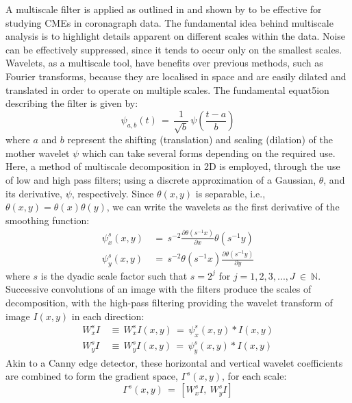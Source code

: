 \documentclass[preprint2]{aastex}
\begin{document}
A multiscale filter is applied as outlined in \citet{2008SoPh..248..457Y} and shown by \citet{2009A&A...495..325B, 2010NatCo...1E..74B, 2010byrnethesis, 2011AdSpR..47.2118G, 2011igi-global} to be effective for studying CMEs in coronagraph data. The fundamental idea behind multiscale analysis is to highlight details apparent on different scales within the data. Noise can be effectively suppressed, since it tends to occur only on the smallest scales. Wavelets, as a multiscale tool, have benefits over previous methods, such as Fourier transforms, because they are localised in space and are easily dilated and translated in order to operate on multiple scales. The fundamental equat5ion describing the filter is given by:
\begin{equation}
\psi_{a,b}(t)\,=\, \frac{1}{\sqrt{b}} \, \psi (\frac{t-a}{b})
\end{equation}
where $a$ and $b$ represent the shifting (translation) and scaling (dilation) of the mother wavelet $\psi$ which can take several forms depending on the required use. Here, a method of multiscale decomposition in 2D is employed, through the use of low and high pass filters; using a discrete approximation of a Gaussian, $\theta$, and its derivative, $\psi$, respectively. Since $\theta(x,y)$ is separable, i.e., $\theta(x,y)=\theta(x)\theta(y)$, we can write the wavelets as the first derivative of the smoothing function:
\begin{eqnarray}
\psi_{x}^{s}(x,y)\,&=\, s^{-2} \frac{\partial \theta(s^{-1}x)}{\partial x}\theta(s^{-1}y) \\
\psi_{y}^{s}(x,y)\,&=\, s^{-2} \theta(s^{-1}x)\frac{\partial \theta(s^{-1}y)}{\partial y}
\end{eqnarray}
where $s$ is the dyadic scale factor such that $s=2^j$ for $j=1,2,3,...,J~\in~\mathbb{N}$. Successive convolutions of an image with the filters produce the scales of decomposition, with the high-pass filtering providing the wavelet transform of image $I(x,y)$ in each direction:
\begin{eqnarray}
W_{x}^{s}I \,&\equiv\, W_{x}^s I(x,y)\,=\,\psi_{x}^s (x,y)*I(x,y) \\
W_{y}^{s}I \,&\equiv\, W_{y}^s I(x,y)\,=\,\psi_{y}^s (x,y)*I(x,y)
\end{eqnarray}
Akin to a Canny edge detector, these horizontal and vertical wavelet coefficients are combined to form the gradient space, $\Gamma^s(x,y)$, for each scale: 
\begin{equation}
\Gamma^s (x,y)\, = \,\left[W_{x}^s I,~W_{y}^s I \right]
\end{equation}
\end{document}
